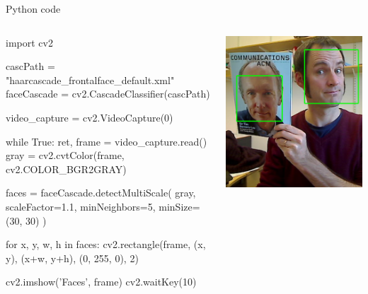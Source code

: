 \documentclass[compress]{beamer}
\begin{document}
\begin{frame}[fragile]{Python code}

    \begin{columns}
        \begin{column}{0.7\linewidth}
            \begin{pythoncode}
import cv2

cascPath = "haarcascade_frontalface_default.xml"
faceCascade = cv2.CascadeClassifier(cascPath)

video_capture = cv2.VideoCapture(0)

while True:
    ret, frame = video_capture.read()
    gray = cv2.cvtColor(frame, cv2.COLOR_BGR2GRAY)

    faces = faceCascade.detectMultiScale(
        gray,
        scaleFactor=1.1,
        minNeighbors=5,
        minSize=(30, 30)
    )

    for x, y, w, h in faces:
        cv2.rectangle(frame, (x, y), (x+w, y+h), (0, 255, 0), 2)

    cv2.imshow('Faces', frame)
    cv2.waitKey(10)
            \end{pythoncode}

        \end{column}
        \begin{column}{0.3\linewidth}
            \begin{center}
                \includegraphics[width=\linewidth]{python-sample}
            \end{center}
        \end{column}
    \end{columns}
\end{frame}
\end{document}
